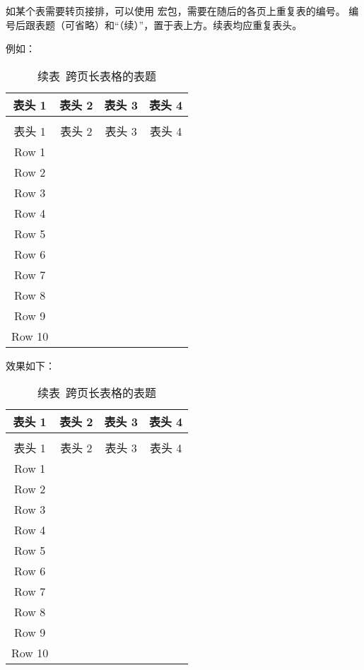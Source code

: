 如某个表需要转页接排，可以使用  宏包，需要在随后的各页上重复表的编号。
编号后跟表题（可省略）和“（续）”，置于表上方。续表均应重复表头。

例如：

\begin{python}
\begin{longtable}{cccc}
	\caption{跨页长表格的表题}
	\label{tab:longtable} \\
	\toprule
	表头 1 & 表头 2 & 表头 3 & 表头 4 \\
	\midrule
	\endfirsthead
	\caption*{续表~\thetable\quad 跨页长表格的表题} \\
	\toprule
	表头 1 & 表头 2 & 表头 3 & 表头 4 \\
	\midrule
	\endhead
	\bottomrule
	\endfoot
	Row 1  & & & \\
	Row 2  & & & \\
	Row 3  & & & \\
	Row 4  & & & \\
	Row 5  & & & \\
	Row 6  & & & \\
	Row 7  & & & \\
	Row 8  & & & \\
	Row 9  & & & \\
	Row 10 & & & \\
\end{longtable}
\end{python}

效果如下：

\begin{longtable}{cccc}
	\caption{跨页长表格的表题}
	\label{tab:longtable} \\
	\toprule
	表头 1 & 表头 2 & 表头 3 & 表头 4 \\
	\midrule
	\endfirsthead
	\caption*{续表~\thetable\quad 跨页长表格的表题} \\
	\toprule
	表头 1 & 表头 2 & 表头 3 & 表头 4 \\
	\midrule
	\endhead
	\bottomrule
	\endfoot
	Row 1  & & & \\
	Row 2  & & & \\
	Row 3  & & & \\
	Row 4  & & & \\
	Row 5  & & & \\
	Row 6  & & & \\
	Row 7  & & & \\
	Row 8  & & & \\
	Row 9  & & & \\
	Row 10 & & & \\
\end{longtable}

